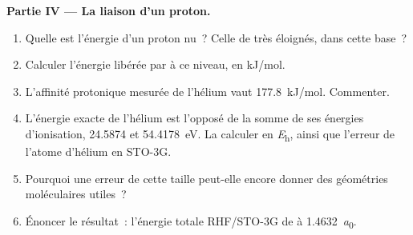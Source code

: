 \begin{problem}
\medskip\noindent\textbf{Partie IV --- La liaison d'un proton.}
\begin{enumerate}[resume]
  \item Quelle est l'énergie d'un proton nu~? Celle de  très
        éloignés, dans cette base~?
  \item Calculer l'énergie libérée par  à ce niveau,
        en \unit{kJ/mol}.
  \item L'affinité protonique mesurée de l'hélium vaut
        \qty{177.8}{kJ/mol}. Commenter.
  \item L'énergie exacte de l'hélium est l'opposé de la somme de ses
        énergies d'ionisation, 24.5874 et \qty{54.4178}{eV}. La calculer
        en \unit{\hartree}, ainsi que l'erreur de l'atome d'hélium en
        STO-3G.
  \item Pourquoi une erreur de cette taille peut-elle encore donner des
        géométries moléculaires utiles~?
  \item Énoncer le résultat~: l'énergie totale RHF/STO-3G de  à
        \qty{1.4632}{\bohr}.
\end{enumerate}
\end{problem}

